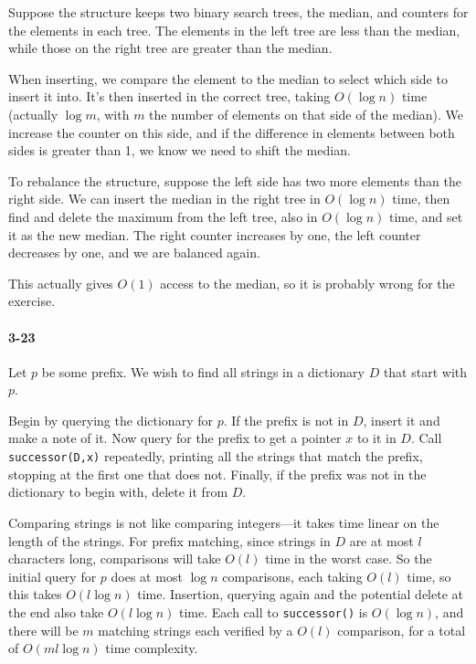 \documentclass{report}
\begin{document}
Suppose the structure keeps two binary search trees, the median, and counters for the elements in each tree. The elements in the left tree are less than the median, while those on the right tree are greater than the median.

When inserting, we compare the element to the median to select which side to insert it into. It's then inserted in the correct tree, taking $O(\log n)$ time (actually $\log m$, with $m$ the number of elements on that side of the median). We increase the counter on this side, and if the difference in elements between both sides is greater than 1, we know we need to shift the median.

To rebalance the structure, suppose the left side has two more elements than the right side. We can insert the median in the right tree in $O(\log n)$ time, then find and delete the maximum from the left tree, also in $O(\log n)$ time, and set it as the new median. The right counter increases by one, the left counter decreases by one, and we are balanced again.

This actually gives $O(1)$ access to the median, so it is probably wrong for the exercise.

\paragraph{3-23} Let $p$ be some prefix. We wish to find all strings in a dictionary $D$ that start with $p$.

Begin by querying the dictionary for $p$. If the prefix is not in $D$, insert it and make a note of it. Now query for the prefix to get a pointer $x$ to it in $D$. Call \lstinline!successor(D,x)! repeatedly, printing all the strings that match the prefix, stopping at the first one that does not. Finally, if the prefix was not in the dictionary to begin with, delete it from $D$.

Comparing strings is not like comparing integers---it takes time linear on the length of the strings. For prefix matching, since strings in $D$ are at most $l$ characters long, comparisons will take $O(l)$ time in the worst case. So the initial query for $p$ does at most $\log n$ comparisons, each taking $O(l)$ time, so this takes $O(l\log n)$ time. Insertion, querying again and the potential delete at the end also take $O(l\log n)$ time. Each call to \lstinline!successor()! is $O(\log n)$, and there will be $m$ matching strings each verified by a $O(l)$ comparison, for a total of $O(ml\log n)$ time complexity.
\end{document}
